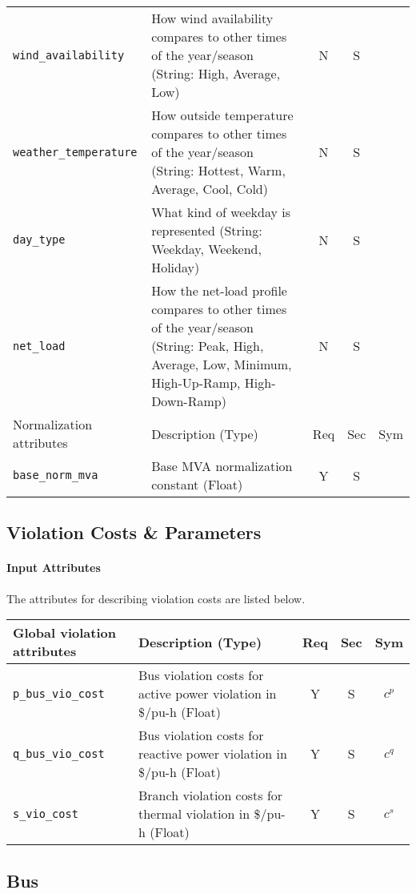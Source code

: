 \documentclass{article}
\begin{document}
\begin{center}
\begin{tabular}{ l | p{3.5in} | c | c | c |}
  {\tt wind\_availability} & How wind availability compares to other times of the year/season (String: High, Average, Low) & N & S & \\
  {\tt weather\_temperature} & How outside temperature compares to other times of the year/season (String: Hottest, Warm, Average, Cool, Cold) & N & S & \\
  {\tt day\_type} & What kind of weekday is represented (String: Weekday, Weekend, Holiday) & N & S & \\
  {\tt net\_load} & How the net-load profile compares to other times of the year/season (String: Peak, High, Average, Low, Minimum, High-Up-Ramp, High-Down-Ramp) & N & S & \\
\hline
Normalization attributes & Description (Type) & Req & Sec & Sym\\
\hline
{\tt base\_norm\_mva} & Base MVA normalization constant (Float)  & Y & S &  \\
  \hline
\end{tabular}
\end{center}

\subsection{Violation Costs \& Parameters}
\label{nom:violation}
\paragraph{Input Attributes} The attributes for describing violation costs are listed below.


\begin{center}
\small
\begin{tabular}{ l | l | c | c | c |}
Global violation attributes & Description (Type) & Req & Sec & Sym\\
\hline
{\tt p\_bus\_vio\_cost} & Bus violation costs for active power violation in \$/pu-h (Float)& Y & S & $c^{p}$\\  
{\tt q\_bus\_vio\_cost} & Bus violation costs for reactive power violation in \$/pu-h (Float)& Y & S &$c^{q}$ \\    
    {\tt s\_vio\_cost} & Branch violation costs for thermal violation in \$/pu-h (Float) & Y & S &$c^{s}$  \\
\hline
\end{tabular}
\end{center}


\subsection{Bus}
\label{nom:bus}
\end{document}
